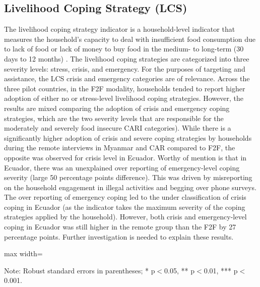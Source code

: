 \documentclass[11pt,harvard]{article}
\begin{document}
	\pagebreak
	
\subsection{Livelihood Coping Strategy (LCS)}
	
The livelihood coping strategy indicator is a household-level indicator that measures the household’s capacity to deal with insufficient food consumption due to lack of food or lack of money to buy food in the medium- to long-term  (30 days to 12 months) . The livelihood coping strategies are categorized into three severity levels: stress, crisis, and emergency. For the purposes of targeting and assistance, the LCS crisis and emergency categories are of relevance. 
Across the three pilot countries, in the F2F modality, households tended to report higher adoption of either no or stress-level livelihood coping strategies. However, the results are mixed comparing the adoption of crisis and emergency coping strategies, which are the two severity levels that are responsible for the moderately and severely food insecure CARI categories). While there is a significantly higher adoption of crisis and severe coping strategies by households during the remote interviews in Myanmar and CAR compared to F2F, the opposite was observed for crisis level in Ecuador.  Worthy of mention is that in Ecuador, there was an unexplained over reporting of emergency-level coping severity (large 50 percentage points difference). This was driven by misreporting on the household engagement in illegal activities and begging over phone surveys. The over reporting of emergency coping led to the under classification of crisis coping in Ecuador (as the indicator takes the maximum severity of the coping strategies applied by the household). However, both crisis and emergency-level coping in Ecuador was still higher in the remote group than the F2F by 27 percentage points. Further investigation is needed to explain these results.
	
	\begin{table}[htbp]
		\centering
		\begin{adjustbox}{max width=\textwidth}
			\begin{threeparttable}
				\caption{Impact of Survey Modality on Livelihood Coping Strategy Index}
				\scriptsize
				 
				\label{tab:LCS_Modality_All_Country}
				\begin{tablenotes}
					\item Note: Robust standard errors in parentheses; * p$<$0.05, ** p$<$0.01, *** p$<$0.001. 
				\end{tablenotes}
			\end{threeparttable}
		\end{adjustbox}
	\end{table}
	
\end{document}
